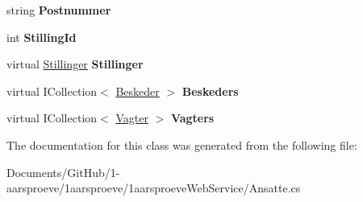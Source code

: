 \begin{DoxyCompactItemize}
\item 
\hypertarget{class__1aarsproeve_web_service_1_1_ansatte_ae3351561fa7a58903c41481e9d166ddb}{}string {\bfseries Postnummer}\label{class__1aarsproeve_web_service_1_1_ansatte_ae3351561fa7a58903c41481e9d166ddb}

\item 
\hypertarget{class__1aarsproeve_web_service_1_1_ansatte_a182d7ddf57afa474ccd698625d05998c}{}int {\bfseries Stilling\+Id}\label{class__1aarsproeve_web_service_1_1_ansatte_a182d7ddf57afa474ccd698625d05998c}

\item 
\hypertarget{class__1aarsproeve_web_service_1_1_ansatte_ad1ed087ad6af3c5739a70b5764ec985e}{}virtual \hyperlink{class__1aarsproeve_web_service_1_1_stillinger}{Stillinger} {\bfseries Stillinger}\label{class__1aarsproeve_web_service_1_1_ansatte_ad1ed087ad6af3c5739a70b5764ec985e}

\item 
\hypertarget{class__1aarsproeve_web_service_1_1_ansatte_a136eda68e5100d221a2cedf4b92997bd}{}virtual I\+Collection$<$ \hyperlink{class__1aarsproeve_web_service_1_1_beskeder}{Beskeder} $>$ {\bfseries Beskeders}\label{class__1aarsproeve_web_service_1_1_ansatte_a136eda68e5100d221a2cedf4b92997bd}

\item 
\hypertarget{class__1aarsproeve_web_service_1_1_ansatte_ae30384475f123f2f3b50af71be05934c}{}virtual I\+Collection$<$ \hyperlink{class__1aarsproeve_web_service_1_1_vagter}{Vagter} $>$ {\bfseries Vagters}\label{class__1aarsproeve_web_service_1_1_ansatte_ae30384475f123f2f3b50af71be05934c}

\end{DoxyCompactItemize}


The documentation for this class was generated from the following file\+:\begin{DoxyCompactItemize}
\item 
Documents/\+Git\+Hub/1-\/aarsproeve/1aarsproeve/1aarsproeve\+Web\+Service/Ansatte.\+cs\end{DoxyCompactItemize}

